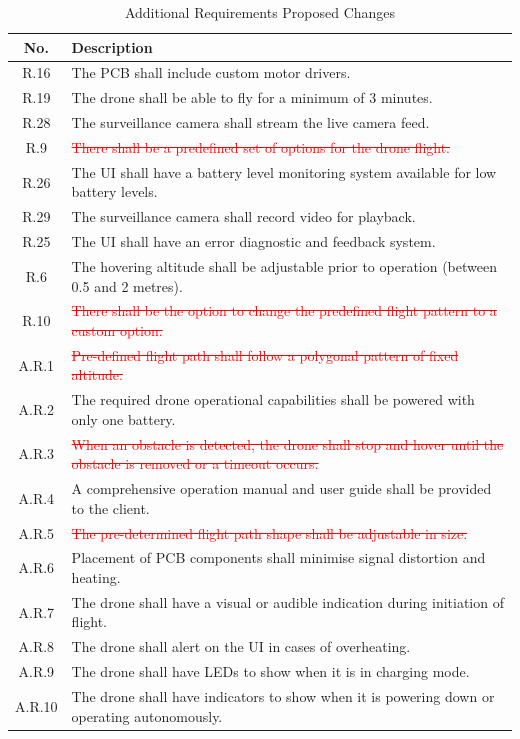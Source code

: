 \begin{table}[H]
\centering
\caption{Additional Requirements Proposed Changes}
\begin{tabular}{|c|p{11cm}|}
\hline
\textbf{No.} & \textbf{Description} \\ \hline
R.16 & The PCB shall include custom motor drivers. \\ \hline
R.19 & The drone shall be able to fly for a minimum of 3 minutes. \\ \hline
R.28 & The surveillance camera shall stream the live camera feed. \\ \hline
R.9 & \textcolor{red}{\sout{There shall be a predefined set of options for the drone flight.}} \\ \hline
R.26 & The UI shall have a battery level monitoring system available for low battery levels. \\ \hline
R.29 & The surveillance camera shall record video for playback. \\ \hline
R.25 & The UI shall have an error diagnostic and feedback system. \\ \hline
R.6 & The hovering altitude shall be adjustable prior to operation (between 0.5 and 2 metres). \\ \hline
R.10 & \textcolor{red}{\sout{There shall be the option to change the predefined flight pattern to a custom option.}} \\ \hline
A.R.1 & \textcolor{red}{\sout{Pre-defined flight path shall follow a polygonal pattern of fixed altitude.}} \\ \hline
A.R.2 & The required drone operational capabilities shall be powered with only one battery. \\ \hline
A.R.3 & \textcolor{red}{\sout{When an obstacle is detected, the drone shall stop and hover until the obstacle is removed or a timeout occurs.}} \\ \hline
A.R.4 & A comprehensive operation manual and user guide shall be provided to the client. \\ \hline
A.R.5 & \textcolor{red}{\sout{The pre-determined flight path shape shall be adjustable in size.}} \\ \hline
A.R.6 & Placement of PCB components shall minimise signal distortion and heating. \\ \hline
A.R.7 & The drone shall have a visual or audible indication during initiation of flight. \\ \hline
A.R.8 & The drone shall alert on the UI in cases of overheating. \\ \hline
A.R.9 & The drone shall have LEDs to show when it is in charging mode. \\ \hline
A.R.10 & The drone shall have indicators to show when it is powering down or operating autonomously. \\ \hline
\end{tabular}
\end{table}

